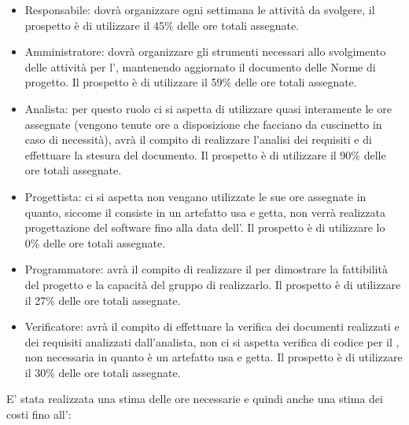 \begin{itemize}
\item Responsabile: dovrà organizzare ogni settimana le attività da svolgere, il prospetto è di utilizzare il 45\% delle ore totali assegnate.
\item Amministratore: dovrà organizzare gli strumenti necessari allo svolgimento delle attività per l', mantenendo aggiornato il documento delle Norme di progetto.
Il prospetto è di utilizzare il 59\% delle ore totali assegnate.
\item Analista: per questo ruolo ci si aspetta di utilizzare quasi interamente le ore assegnate (vengono tenute ore a disposizione che facciano da cuscinetto in caso di necessità), avrà il compito di realizzare l'analisi dei requisiti e di effettuare la stesura del documento.
Il prospetto è di utilizzare il 90\% delle ore totali assegnate.
\item Progettista: ci si aspetta non vengano utilizzate le sue ore assegnate in quanto, siccome il  consiste in un artefatto usa e getta, non verrà realizzata progettazione del software fino alla data dell'.
Il prospetto è di utilizzare lo 0\% delle ore totali assegnate.
\item Programmatore: avrà il compito di realizzare il  per dimostrare la fattibilità del progetto e la capacità del gruppo di realizzarlo.
Il prospetto è di utilizzare il 27\% delle ore totali assegnate.
\item Verificatore: avrà il compito di effettuare la verifica dei documenti realizzati e dei requisiti analizzati dall'analista, non ci si aspetta verifica di codice per il , non necessaria in quanto è un artefatto usa e getta.
Il prospetto è di utilizzare il 30\% delle ore totali assegnate.
\end{itemize}
E' stata realizzata una stima delle ore necessarie e quindi anche una stima dei costi fino all':
